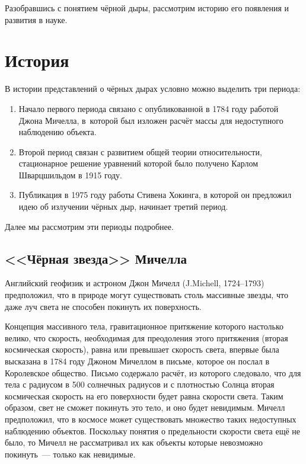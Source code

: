 \documentclass[a4paper, 12pt]{extarticle}
\begin{document}
  Разобравшись с понятием чёрной дыры, рассмотрим историю его появления и развития в науке.

  \section{История}

  В истории представлений о чёрных дырах условно можно выделить три периода:
  \begin{enumerate}
    \item Начало первого периода связано с опубликованной в 1784 году работой Джона Мичелла,
      в~которой был изложен расчёт массы для недоступного наблюдению объекта.
    \item Второй период связан с развитием общей теории относительности, стационарное решение
      уравнений которой было получено Карлом Шварцшильдом в 1915 году.
    \item Публикация в 1975 году работы Стивена Хокинга, в которой он предложил идею об излучении
    чёрных дыр, начинает третий период.
  \end{enumerate}

  Далее мы рассмотрим эти периоды подробнее.

  \subsection{<<Чёрная звезда>> Мичелла}

  Английский геофизик и астроном Джон Мичелл (J.Michell, 1724--1793) предположил, что в природе могут
  существовать столь массивные звезды, что даже луч света не способен покинуть их поверхность. 

  Концепция массивного тела, гравитационное притяжение которого настолько велико, что скорость,
  необходимая для преодоления этого притяжения (вторая космическая скорость), равна или превышает
  скорость света, впервые была высказана в 1784 году Джоном Мичеллом в письме, которое он послал в
  Королевское общество. Письмо содержало расчёт, из которого следовало, что для тела с радиусом в
  500 солнечных радиусов и с плотностью Солнца вторая космическая скорость на его поверхности будет
  равна скорости света. Таким образом, свет не сможет покинуть это тело, и оно будет невидимым.
  Мичелл предположил, что в космосе может существовать множество таких недоступных наблюдению объектов.
  Поскольку понятия о предельности скорости света ещё не было, то Мичелл не рассматривал их как
  объекты которые невозможно покинуть~--- только как невидимые.
  
\end{document}

